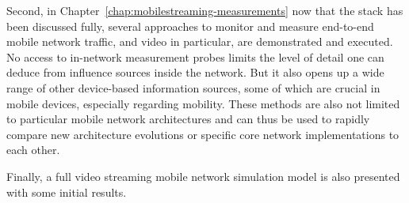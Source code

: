 Second, in Chapter~\ref{chap:mobilestreaming-measurements} now that the stack has been discussed fully, several approaches to monitor and measure end-to-end mobile network traffic, and video in particular, are demonstrated and executed. No access to in-network measurement probes limits the level of detail one can deduce from influence sources inside the network. But it also opens up a wide range of other device-based information sources, some of which are crucial in mobile devices, especially regarding mobility. These methods are also not limited to particular mobile network architectures and can thus be used to rapidly compare new architecture evolutions or specific core network implementations to each other. 

Finally, a full video streaming mobile network simulation model is also presented with some initial results.
















